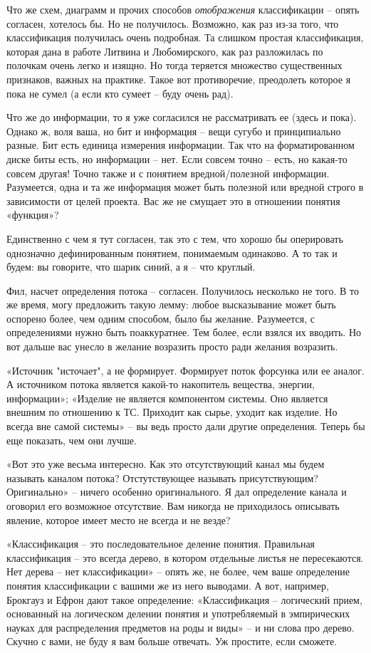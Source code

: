 \documentclass[a4paper,11pt]{article}
\begin{document}
Что же схем, диаграмм и прочих способов \emph{отображения} классификации –
опять согласен, хотелось бы. Но не получилось. Возможно, как раз из-за того,
что классификация получилась очень подробная. Та слишком простая
классификация, которая дана в работе Литвина и Любомирского, как раз
разложилась по полочкам очень легко и изящно. Но тогда теряется множество
существенных признаков, важных на практике. Такое вот противоречие, преодолеть
которое я пока не сумел (а если кто сумеет – буду очень рад).

Что же до информации, то я уже согласился не рассматривать ее (здесь и пока).
Однако ж, воля ваша, но бит и информация – вещи сугубо и принципиально разные.
Бит есть единица измерения информации. Так что на форматированном диске биты
есть, но информации – нет. Если совсем точно – есть, но какая-то совсем
другая! Точно также и с понятием вредной/полезной информации. Разумеется, одна
и та же информация может быть полезной или вредной строго в зависимости от
целей проекта. Вас же не смущает это в отношении понятия «функция»?

Единственно с чем я тут согласен, так это с тем, что хорошо бы оперировать
однозначно дефинированным понятием, понимаемым одинаково. А то так и будем: вы
говорите, что шарик синий, а я – что круглый.

Фил, насчет определения потока – согласен. Получилось несколько не того. В то
же время, могу предложить такую лемму: любое высказывание может быть оспорено
более, чем одним способом, было бы желание. Разумеется, с определениями нужно
быть поаккуратнее. Тем более, если взялся их вводить. Но вот дальше вас унесло
в желание возразить просто ради желания возразить.

«Источник "источает", а не формирует. Формирует поток форсунка или ее аналог.
А источником потока является какой-то накопитель вещества, энергии,
информации»; «Изделие не является компонентом системы. Оно является внешним по
отношению к ТС. Приходит как сырье, уходит как изделие. Но всегда вне самой
системы» -- вы ведь просто дали другие определения. Теперь бы еще показать,
чем они лучше.

«Вот это уже весьма интересно. Как это отсутствующий канал мы будем называть
каналом потока? Отстутствующее называть присутствующим? Оригинально» -- ничего
особенно оригинального. Я дал определение канала и оговорил его возможное
отсутствие. Вам никогда не приходилось описывать явление, которое имеет место
не всегда и не везде?

«Классификация -- это последовательное деление понятия. Правильная
классификация -- это всегда дерево, в котором отдельные листья не
пересекаются.  Нет дерева -- нет классификации» -- опять же, не более, чем
ваше определение понятия классификации с вашими же из него выводами. А вот,
например, Брокгауз и Ефрон дают такое определение: «Классификация --
логический прием, основанный на логическом делении понятия и употребляемый в
эмпирических науках для распределения предметов на роды и виды» -- и ни слова
про дерево. Скучно с вами, не буду я вам больше отвечать. Уж простите, если
сможете.
\end{document}
